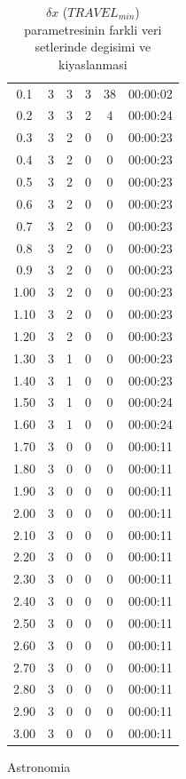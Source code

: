 \documentclass[review]{elsarticle}
\begin{document}
\begin{table}[H]
\begin{subtable}[h]{0.45\textwidth}
{\begin{tabular}{@{}cccccc@{}}
                0.1 & 3 & 3 & 3 & 38 & 00:00:02 \\
                0.2 & 3 & 3 & 2 & 4 & 00:00:24 \\
                0.3 & 3 & 2 & 0 & 0 & 00:00:23 \\
                0.4 & 3 & 2 & 0 & 0 & 00:00:23 \\
                \rowcolor{LightCyan}
                0.5 & 3 & 2 & 0 & 0 & 00:00:23 \\
                0.6 & 3 & 2 & 0 & 0 & 00:00:23 \\
                0.7 & 3 & 2 & 0 & 0 & 00:00:23 \\
                0.8 & 3 & 2 & 0 & 0 & 00:00:23 \\
                0.9 & 3 & 2 & 0 & 0 & 00:00:23 \\
                1.00 & 3 & 2 & 0 & 0 & 00:00:23 \\
                1.10 & 3 & 2 & 0 & 0 & 00:00:23 \\
                1.20 & 3 & 2 & 0 & 0 & 00:00:23 \\
                1.30 & 3 & 1 & 0 & 0 & 00:00:23 \\
                1.40 & 3 & 1 & 0 & 0 & 00:00:23 \\
                1.50 & 3 & 1 & 0 & 0 & 00:00:24 \\
                1.60 & 3 & 1 & 0 & 0 & 00:00:24 \\
                1.70 & 3 & 0 & 0 & 0 & 00:00:11 \\
                1.80 & 3 & 0 & 0 & 0 & 00:00:11 \\
                1.90 & 3 & 0 & 0 & 0 & 00:00:11 \\
                2.00 & 3 & 0 & 0 & 0 & 00:00:11 \\
                2.10 & 3 & 0 & 0 & 0 & 00:00:11 \\
                2.20 & 3 & 0 & 0 & 0 & 00:00:11 \\
                2.30 & 3 & 0 & 0 & 0 & 00:00:11 \\
                2.40 & 3 & 0 & 0 & 0 & 00:00:11 \\
                2.50 & 3 & 0 & 0 & 0 & 00:00:11 \\
                2.60 & 3 & 0 & 0 & 0 & 00:00:11 \\
                2.70 & 3 & 0 & 0 & 0 & 00:00:11 \\
                2.80 & 3 & 0 & 0 & 0 & 00:00:11 \\
                2.90 & 3 & 0 & 0 & 0 & 00:00:11 \\
                3.00 & 3 & 0 & 0 & 0 & 00:00:11 \\
        \end{tabular}
        }
        \caption{Astronomia}
        \label{tab:astronomia_travelmin}
    \end{subtable}
    \caption{$\delta{x}$ ($TRAVEL_{min}$) parametresinin farkli veri setlerinde degisimi ve kiyaslanmasi}
    \label{tab:travelmin}
\end{table}
\end{document}

